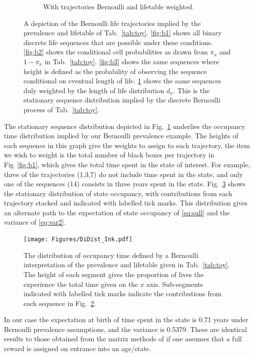 \documentclass{bmcart}
\begin{document}
\begin{figure}
\begin{subfigure}[b]{0.4\textwidth}
        \caption{With trajectories Bernoulli and lifetable weighted.\\}
        \label{fig:b4}
    \end{subfigure}
    \caption{A depiction of the Bernoulli life trajectories implied by the prevalence and lifetable of Tab.~\ref{tab:toy}. \ref{fig:b1} shows all binary discrete life sequences that are possible under these conditions. \ref{fig:b2} shows the conditional cell probabilities as drawn from $\pi_x$ and $1-\pi_x$ in Tab.~\ref{tab:toy}. \ref{fig:b3} shows the same sequences where height is defined as the probability of observing the sequence conditional on eventual length of life. \ref{fig:b4} shows the same sequences duly weighted by the length of life distribution $d_x$. This is the stationary sequence distribution implied by the discrete Bernoulli process of Tab.~\ref{tab:toy}. }\label{fig:bernexplain}
\end{figure}

The stationary sequence distribution depicted in Fig.~\ref{fig:b4} underlies the occupancy time distribution implied by our Bernoulli prevalence example. The heights of each sequence in this graph give the weights to assign to each trajectory, the item we wish to weight is the total number of black boxes per trajectory in Fig~\ref{fig:b1}, which gives the total time spent in the state of interest. For example, three of the trajectories (1,3,7) do not include time spent in the state, and only one of the sequences (14) consists in three years spent in the state. Fig.~\ref{fig:DiDist} shows the stationary distribution of state occupancy, with contributions from each trajectory stacked and indicated with labelled tick marks. This distribution gives an alternate path to the expectation of state occupancy of \eqref{eq:sull} and the variance of \eqref{eq:var2}. 
\begin{figure}[ht!]
\centering
\texttt{[image: Figures/DiDist\_Ink.pdf]}
\caption{The distribution of occupancy time defined by a Bernoulli interpretation of the prevalence and lifetable given in Tab.~\ref{tab:toy}. The height of each segment gives the proportion of lives the experience the total time given on the $x$ axis. Sub-segments indicated with labelled tick marks indicate the contributions from each sequence in Fig.~\ref{fig:bernexplain}.}\label{fig:DiDist}
\end{figure}

In our case the expectation at birth of time spent in the state is 0.71 years under Bernoulli prevalence assumptions, and the variance is 0.5379. These are identical results to those obtained from the matrix methods of \cite{caswell2018matrix} if one assumes that a full reward is assigned on entrance into an age/state.
\end{document}
